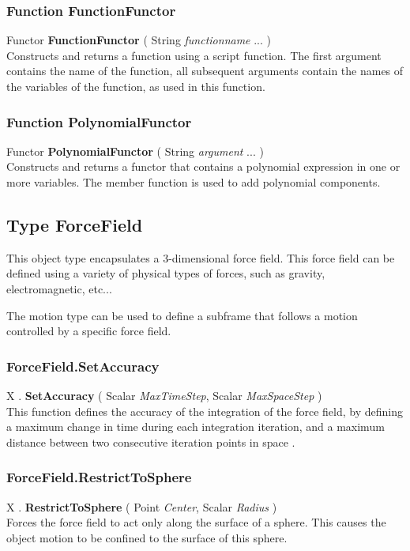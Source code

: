 \subsubsection{Function FunctionFunctor \label{F:FunctionFunctor}}
Functor \textbf{FunctionFunctor} ( String \textit{functionname} ...  ) \\
Constructs and returns a function using a script function. The first argument contains the name of the function, all subsequent arguments contain the names of the variables of the function, as used in this function.


\subsubsection{Function PolynomialFunctor \label{F:PolynomialFunctor}}
Functor \textbf{PolynomialFunctor} ( String \textit{argument} ...  ) \\
Constructs and returns a functor that contains a polynomial expression in one or more variables. The member function  is used to add polynomial components.

\subsection{Type ForceField \label{T:ForceField}}
This object type encapsulates a 3-dimensional force field. This force field can be defined using a variety of physical types of forces, such as gravity, electromagnetic, etc...

The motion type  can be used to define a subframe that follows a motion controlled by a specific force field.

\subsubsection{ForceField.SetAccuracy \label{F:ForceField:SetAccuracy}}
X . \textbf{SetAccuracy} ( Scalar \textit{MaxTimeStep}, Scalar \textit{MaxSpaceStep} ) \\
This function defines the accuracy of the integration of the force field, by defining a maximum change in time  during each integration iteration, and a maximum distance between two consecutive iteration points in space .

\subsubsection{ForceField.RestrictToSphere \label{F:ForceField:RestrictToSphere}}
X . \textbf{RestrictToSphere} ( Point \textit{Center}, Scalar \textit{Radius} ) \\
Forces the force field to act only along the surface of a sphere. This causes the object motion to be confined to the surface of this sphere.

